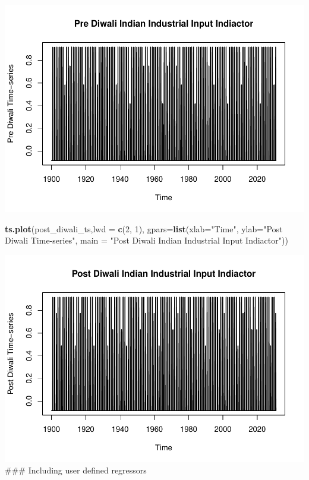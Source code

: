 \documentclass[
]{article}
\newenvironment{Shaded}{\begin{snugshade}}{\end{snugshade}}
\newcommand{\AttributeTok}[1]{\textcolor[rgb]{0.13,0.29,0.53}{#1}}
\newcommand{\DecValTok}[1]{\textcolor[rgb]{0.00,0.00,0.81}{#1}}
\newcommand{\FunctionTok}[1]{\textcolor[rgb]{0.13,0.29,0.53}{\textbf{#1}}}
\newcommand{\NormalTok}[1]{#1}
\newcommand{\StringTok}[1]{\textcolor[rgb]{0.31,0.60,0.02}{#1}}
\begin{document}
\includegraphics{regressors_of_diwali_seasonality_for_industrial_production_files/figure-latex/unnamed-chunk-5-1.pdf}

\begin{Shaded}
\begin{Highlighting}[]
\FunctionTok{ts.plot}\NormalTok{(post\_diwali\_ts,}\AttributeTok{lwd =} \FunctionTok{c}\NormalTok{(}\DecValTok{2}\NormalTok{, }\DecValTok{1}\NormalTok{), }\AttributeTok{gpars=}\FunctionTok{list}\NormalTok{(}\AttributeTok{xlab=}\StringTok{"Time"}\NormalTok{, }\AttributeTok{ylab=}\StringTok{"Post Diwali Time{-}series"}\NormalTok{, }\AttributeTok{main =} \StringTok{"Post Diwali Indian Industrial Input Indiactor"}\NormalTok{))}
\end{Highlighting}
\end{Shaded}

\includegraphics{regressors_of_diwali_seasonality_for_industrial_production_files/figure-latex/unnamed-chunk-6-1.pdf}
\#\#\# Including user defined regressors
\end{document}
